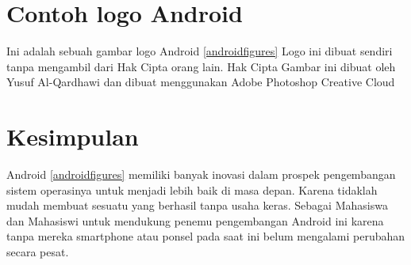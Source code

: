	\section{Contoh logo Android}
		Ini adalah sebuah gambar logo Android \ref{androidfigures}
		Logo ini dibuat sendiri tanpa mengambil dari Hak Cipta orang lain.
		Hak Cipta Gambar ini dibuat oleh Yusuf Al-Qardhawi dan dibuat menggunakan Adobe Photoshop Creative Cloud
		
	\section{Kesimpulan}
		Android \ref{androidfigures} memiliki banyak inovasi dalam prospek pengembangan sistem operasinya untuk menjadi lebih baik
		di masa depan. Karena tidaklah mudah membuat sesuatu yang berhasil tanpa usaha keras. Sebagai Mahasiswa
		dan Mahasiswi untuk mendukung penemu pengembangan Android ini karena tanpa mereka smartphone atau ponsel
		pada saat ini belum mengalami perubahan secara pesat.